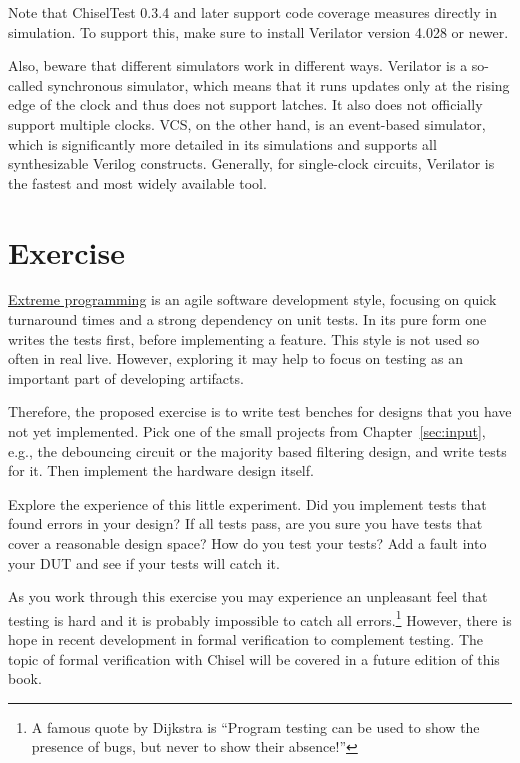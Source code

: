 \documentclass[%
    10pt,
    headinclude, footexclude,
    openright, %
    notitlepage,
    cleardoubleempty,
    headsepline,
    pointlessnumbers,
    bibtotoc, idxtotoc,
    ]{scrbook}
\begin{document}
Note that ChiselTest 0.3.4 and later support code coverage measures directly in simulation.
To support this, make sure to install Verilator version 4.028 or newer.

Also, beware that different simulators work in different ways. Verilator is a so-called
synchronous simulator, which means that it runs updates only at the rising edge of the
clock and thus does not support latches. It also does not officially support multiple
clocks. VCS, on the other hand, is an event-based simulator, which is significantly more
detailed in its simulations and supports all synthesizable Verilog constructs.
Generally, for single-clock circuits, Verilator is the fastest and
most widely available tool.



\section{Exercise}

\href{https://en.wikipedia.org/wiki/Extreme_programming}{Extreme programming} is an agile
software development style, focusing on quick turnaround times and a strong dependency on unit
tests. In its pure form one writes the tests first, before implementing a feature. This style is not used
so often in real live. However, exploring it may help to focus on testing as an important part of
developing artifacts.

Therefore, the proposed exercise is to write test benches for designs that you have not yet implemented.
Pick one of the small projects from Chapter~\ref{sec:input}, e.g., the debouncing circuit or
the majority based filtering design, and write tests for it. Then implement the hardware design
itself.

Explore the experience of this little experiment. Did you implement tests that found errors in your design?
If all tests pass, are you sure you have tests that cover a reasonable design space? How do you test
your tests? Add a fault into your DUT and see if your tests will catch it.

As you work through this exercise you may experience an unpleasant feel that testing is hard and
it is probably impossible to catch all errors.\footnote{A famous quote by Dijkstra is ``Program testing can
be used to show the presence of bugs, but never to show their absence!''}
However, there is hope in recent development in formal verification to complement testing.
The topic of formal verification with Chisel will be covered in a future edition of this book.
\end{document}
